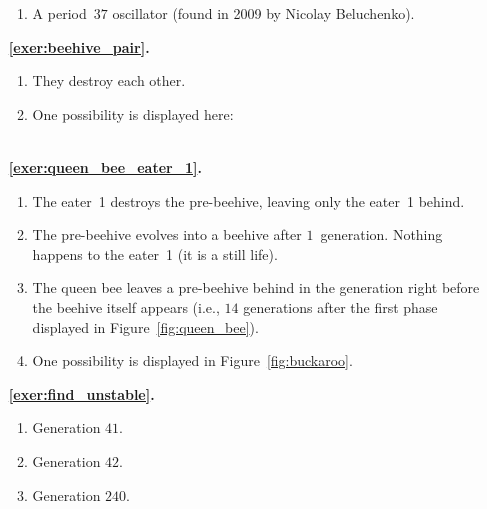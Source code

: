 \begin{multicols}{2}
\begin{itemize}[leftmargin=0em]
\begin{enumerate}[leftmargin=1.5em,label=\bf\color{ocre}(\alph*)]
			\item A period~$37$ oscillator (found in 2009 by Nicolay Beluchenko). \\
		\end{enumerate}
	
	
		\item[\bf\color{ocre}\sffamily\ref{exer:beehive_pair}.] \begin{enumerate}[leftmargin=1.5em,label=\bf\color{ocre}(\alph*)]
			\item They destroy each other.
			
			\item One possibility is displayed here: \\[-0.6em]
			
			 \\
		\end{enumerate}
		
		
		\item[\bf\color{ocre}\sffamily\ref{exer:queen_bee_eater_1}.] \begin{enumerate}[leftmargin=1.5em,label=\bf\color{ocre}(\alph*)]
			\item The eater~1 destroys the pre-beehive, leaving only the eater~1 behind.
			
			\item The pre-beehive evolves into a beehive after $1$~generation. Nothing happens to the eater~1 (it is a still life).
			
			\item The queen bee leaves a pre-beehive behind in the generation right before the beehive itself appears (i.e., $14$ generations after the first phase displayed in Figure~\ref{fig:queen_bee}).
			
			\item One possibility is displayed in Figure~\ref{fig:buckaroo}. \\
		\end{enumerate} 
	
	
		\item[\bf\color{ocre}\sffamily\ref{exer:find_unstable}.] \begin{enumerate}[leftmargin=1.5em,label=\bf\color{ocre}(\alph*)]
			\item Generation $41$.
			
			\item Generation $42$.
			
			\item Generation $240$.
			

\end{enumerate}
\end{itemize}
\end{multicols}
